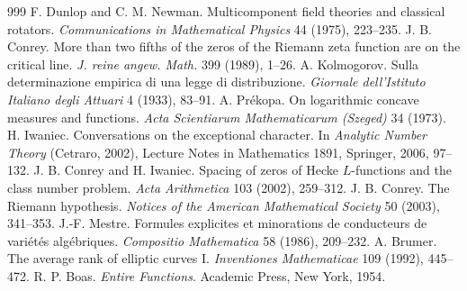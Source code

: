 \begin{thebibliography}{999}
 F. Dunlop and C. M. Newman. Multicomponent field theories and classical rotators. \emph{Communications in Mathematical Physics} 44 (1975), 223--235. %
 J. B. Conrey. More than two fifths of the zeros of the Riemann zeta function are on the critical line. \emph{J. reine angew. Math.} 399 (1989), 1--26.
 A. Kolmogorov. Sulla determinazione empirica di una legge di distribuzione. \emph{Giornale dell'Istituto Italiano degli Attuari} 4 (1933), 83--91.
 A. Pr\'ekopa. On logarithmic concave measures and functions. \emph{Acta Scientiarum Mathematicarum (Szeged)} 34 (1973).
 H. Iwaniec. Conversations on the exceptional character. In \emph{Analytic Number Theory} (Cetraro, 2002), Lecture Notes in Mathematics 1891, Springer, 2006, 97--132. %
 J. B. Conrey and H. Iwaniec. Spacing of zeros of Hecke $L$-functions and the class number problem. \emph{Acta Arithmetica} 103 (2002), 259--312. %
 J. B. Conrey. The Riemann hypothesis. \emph{Notices of the American Mathematical Society} 50 (2003), 341--353. %
 J.-F. Mestre. Formules explicites et minorations de conducteurs de vari\'et\'es alg\'ebriques. \emph{Compositio Mathematica} 58 (1986), 209--232. %
 A. Brumer. The average rank of elliptic curves I. \emph{Inventiones Mathematicae} 109 (1992), 445--472. %
 R. P. Boas. \emph{Entire Functions}. Academic Press, New York, 1954. %

\end{thebibliography}
